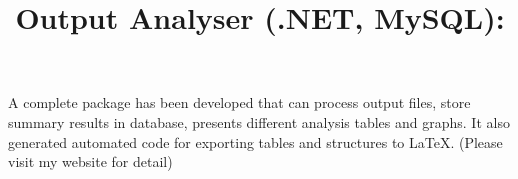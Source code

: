 \begin{resume}
\title{\textbf{Output Analyser ({\CSharp}.NET, MySQL):}}
\begin{position}
A complete package has been developed that can process output files, store summary results in database, presents different analysis tables and graphs. It also generated automated code for exporting tables and structures to \LaTeX. (Please visit my website for detail)
\end{position}





 








%
%



\end{resume}
